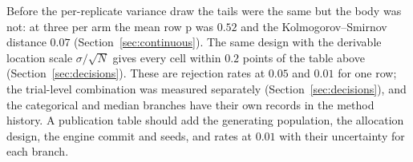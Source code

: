 \documentclass[11pt,a4paper]{article}
\begin{document}
Before the per-replicate variance draw the tails were the same but the body was not: at three per arm the mean row p was $0.52$ and the Kolmogorov--Smirnov distance $0.07$ (Section~\ref{sec:continuous}). The same design with the derivable location scale $\sigma/\sqrt N$ gives every cell within $0.2$ points of the table above (Section~\ref{sec:decisions}). These are rejection rates at $0.05$ and $0.01$ for one row; the trial-level combination was measured separately (Section~\ref{sec:decisions}), and the categorical and median branches have their own records in the method history. A publication table should add the generating population, the allocation design, the engine commit and seeds, and rates at $0.01$ with their uncertainty for each branch.



\end{document}
